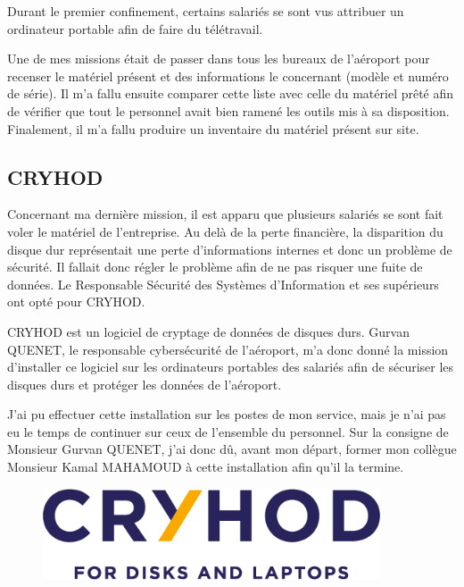 Durant le premier confinement, certains salariés se sont vus attribuer un ordinateur portable afin de faire du télétravail.

Une de mes missions était de passer dans tous les bureaux de l’aéroport pour recenser le matériel présent et des informations le concernant (modèle et numéro de série). Il m'a fallu ensuite comparer cette liste avec celle du matériel prêté afin de vérifier que tout le personnel avait bien ramené les outils mis à sa disposition.
Finalement, il m'a fallu produire un inventaire du matériel présent sur site.\newline

\subsection{CRYHOD}

Concernant ma dernière mission, il est apparu que plusieurs salariés se sont fait voler le matériel de l'entreprise. Au delà de la perte financière, la disparition du disque dur représentait une perte d’informations internes et donc un problème de sécurité. Il fallait donc régler le problème afin de ne pas risquer une fuite de données. Le Responsable Sécurité des Systèmes d’Information et ses supérieurs ont opté pour CRYHOD.


CRYHOD est un logiciel de cryptage de données de disques durs. Gurvan QUENET, le responsable cybersécurité de l’aéroport, m’a donc donné la mission d’installer ce logiciel sur les ordinateurs portables des salariés afin de sécuriser les disques durs et protéger les données de l’aéroport.\newline

J’ai pu effectuer cette installation sur les postes de mon service, mais je n'ai pas eu le temps de continuer sur ceux de l'ensemble du personnel. Sur la consigne de Monsieur Gurvan QUENET, j'ai donc dû, avant mon départ, former mon collègue Monsieur Kamal MAHAMOUD à cette installation afin qu'il la termine.\newline

\begin{figure}[hbt!]
  \centering
  \includegraphics[width=10cm]{Images/logo_cryhod.png}
  \label{fig:logocryhod}
\end{figure}

